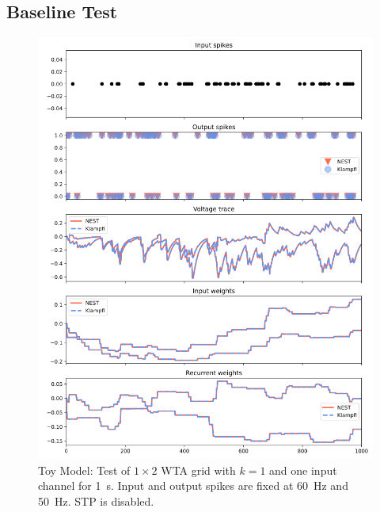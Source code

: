 \subsection{Baseline Test} \label{ssec:baseline_test}
\begin{figure}[htbp]
    \centering
    \includegraphics[width=\columnwidth]{Figures/joint_tm_2wta1.png}
    \caption{Toy Model: Test of $1\times 2$ WTA grid with $k=1$ and one input channel for \SI{1}{\second}. Input and output spikes are fixed at \SI{60}{\hertz} and \SI{50}{\hertz}. STP is disabled.}
    \label{fig:joint_tm_2wta1_A}
\end{figure}
